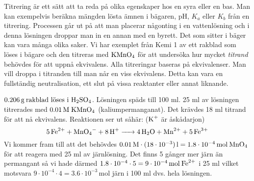 \begin{wrapfigure}{l}{2cm}
{}
\end{wrapfigure}
Titrering är ett sätt att ta reda på olika egenskaper hos en syra eller en bas. Man kan exempelvis beräkna mängden lösta ämnen i bägaren, pH, $K_a$ eller $K_b$ från en titrering. Processen går ut på att man placerar någonting i en vattenlösning och i denna lösningen droppar man in en annan med en byrett. Det som sitter i bäger kan vara många olika saker. Vi har exemplet från Kemi 1 av ett rakblad som löses i bägare och den titreras med \(\ce{KMnO4}\) för att undersöka hur mycket \emph{titrand} behövdes för att uppnå ekvivalens. Alla titreringar baseras på ekvivalenser. Man vill droppa i titranden till man når en viss ekvivalens. Detta kan vara en fullständig neutralisation, ett slut på vissa reaktanter eller annat liknande. 
\begin{exm}
    \(0.206\, \mathrm{g}\: \text{rakblad löses i } \ce{H2SO4}\). Lösningen späds till 100 ml. 25 ml av lösningen titrerades med \(0.01\, \mathrm{M}\; \ce{KMnO_4}\) (kaliumpermanganat). Det krävdes 18 ml titrand för att nå ekvivalens. Reaktionen ser ut såhär: ($\ce{K+}$ är åskådarjon)
    \begin{equation*}
        \ce{5Fe^2+ + MnO4- + 8H+ -> 4H2O + Mn^2+ + 5Fe^3+}
    \end{equation*}
    \noindent Vi kommer fram till att det behövdes $0.01\, \mathrm{M} \cdot (18 \cdot 10^{-3})\, \mathrm{l} = 1.8 \cdot 10^{-4}\, \mathrm{mol}\: \ce{MnO4}$ för att reagera med 25 ml av järnlösning. Det finns 5 gånger mer järn än permangant så vi hade därmed $1.8 \cdot 10^{-4} \cdot 5 = 9 \cdot 10^{-4}\, \mathrm{mol} \: \ce{Fe^2+}$ i 25 ml vilket motsvara $9 \cdot 10^{-4} \cdot 4 = 3.6 \cdot 10^{-3} \, \mathrm{mol}$ järn i 100 ml dvs. hela lösningen.
\end{exm}

